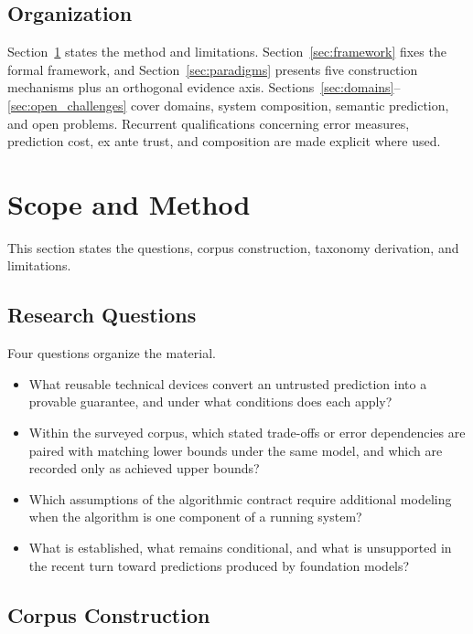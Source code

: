 \documentclass[acmsmall,screen,nonacm]{acmart}
\theoremstyle{acmdefinition}%
\begin{document}
\subsection{Organization}
\label{subsec:organization}

Section~\ref{sec:method} states the method and limitations. Section~\ref{sec:framework} fixes the formal framework, and Section~\ref{sec:paradigms} presents five construction mechanisms plus an orthogonal evidence axis. Sections~\ref{sec:domains}--\ref{sec:open_challenges} cover domains, system composition, semantic prediction, and open problems. Recurrent qualifications concerning error measures, prediction cost, ex ante trust, and composition are made explicit where used.

%
\section{Scope and Method}
\label{sec:method}

This section states the questions, corpus construction, taxonomy derivation, and limitations.

\subsection{Research Questions}
\label{subsec:rq}

Four questions organize the material.

\begin{itemize}
\item[\textbf{RQ1}] What reusable technical devices convert an untrusted prediction into a provable guarantee, and under what conditions does each apply?
\item[\textbf{RQ2}] Within the surveyed corpus, which stated trade-offs or error dependencies are paired with matching lower bounds under the same model, and which are recorded only as achieved upper bounds?
\item[\textbf{RQ3}] Which assumptions of the algorithmic contract require additional modeling when the algorithm is one component of a running system?
\item[\textbf{RQ4}] What is established, what remains conditional, and what is unsupported in the recent turn toward predictions produced by foundation models?
\end{itemize}

\subsection{Corpus Construction}
\label{subsec:corpus}
\end{document}

